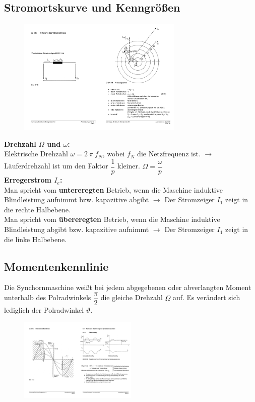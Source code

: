 \documentclass[11pt]{article}
\begin{document}
\subsection*{Stromortskurve und Kenngrößen}
\begin{figure}[H]
	\centering
	\includegraphics[width=0.7\textwidth]{img/SM_Ortskurve.pdf}
\end{figure}

\textbf{Drehzahl $\Omega$ und $\omega$:}\\
Elektrische Drehzahl $\omega = 2~\pi~f_N$, wobei $f_N$ die Netzfrequenz ist. $\rightarrow$ Läuferdrehzahl ist um den Faktor $\dfrac{1}{p}$ kleiner. $\Omega=\dfrac{\omega}{p}$\\

\textbf{Erregerstrom $I_e$:} \\ 
Man spricht vom \textbf{untereregten} Betrieb, wenn die Maschine induktive Blindleistung aufnimmt bzw. kapazitive abgibt $\rightarrow$ Der Stromzeiger $I_1$ zeigt in die rechte Halbebene.\\
Man spricht vom \textbf{übereregten} Betrieb, wenn die Maschine induktive Blindleistung abgibt bzw. kapazitive aufnimmt $\rightarrow$ Der Stromzeiger $I_1$ zeigt in die linke Halbebene.\\

\subsection*{Momentenkennlinie}
Die Synchornmaschine weißt bei jedem abgegebenen oder abverlangten Moment unterhalb des Polradwinkels $\dfrac{\pi}{2}$ die gleiche Drehzahl $\Omega$ auf. Es verändert sich lediglich der Polradwinkel $\vartheta$.

\begin{figure}[H]
	\centering
	\includegraphics[width=0.5\textwidth]{img/SM_Kennlinie.pdf}
\end{figure}
\end{document}

